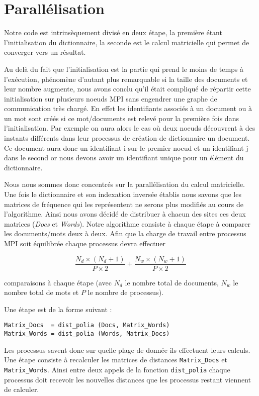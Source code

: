 \section{Parallélisation}

Notre code est intrinsèquement divisé en deux étape,
la première étant l'initialisation du dictionnaire,
la seconde est le calcul matricielle qui permet de
converger vers un résultat.

Au delà du fait que l'initialisation est la partie
qui prend le moins de temps à l'exécution,
phénomène d'autant plus remarquable si la taille des
documents et leur nombre augmente,
nous avons conclu qu'il était compliqué de répartir
cette initialisation sur plusieurs noeuds MPI sans
engendrer une graphe de communication très chargé.
En effet les identifiants associés à un document
ou à un mot sont créés si ce mot/documents est relevé
pour la première fois dans l'initialisation.
Par exemple on aura alors le cas où deux noeuds
découvrent à des instants différents dans leur processus
de création de dictionnaire un document.
Ce document aura donc un identifiant i sur
le premier noeud et un identifiant j dans le second
or nous devons avoir un identifiant unique pour
un élément du dictionnaire.

Nous nous sommes donc concentrés sur la parallélisation
du calcul matricielle.
Une fois le dictionnaire et son indexation inversée
établis nous savons que les matrices de fréquence qui les
représentent ne serons plus modifiés au cours de l'algorithme.
Ainsi nous avons décidé de distribuer à chacun des sites
ces deux matrices ({\it Docs} et {\it Words}).
Notre algorithme consiste à chaque étape à comparer
les documents/mots deux à deux.
Afin que la charge de travail entre processus MPI soit
équilibrée chaque processus devra effectuer

\[ \frac{N_d \times (N_d+1)}{P \times 2}
 + \frac{N_w \times (N_w+1)}{P \times 2} \]

comparaisons à chaque étape
(avec $N_d$ le nombre total de documents,
$N_w$ le nombre total de mots et
$P$ le nombre de processus).

Une étape est de la forme suivant :

\begin{verbatim}
Matrix_Docs  = dist_polia (Docs, Matrix_Words)
Matrix_Words = dist_polia (Words, Matrix_Docs)
\end{verbatim}

Les processus savent donc sur quelle plage de donnée
ils effectuent leurs calculs.
Une étape consiste à recalculer les matrices de distances
{\tt Matrix\_Docs} et {\tt Matrix\_Words}.
Ainsi entre deux appels de la fonction {\tt dist\_polia}
chaque processus doit recevoir les nouvelles distances que
les processus restant viennent de calculer.
